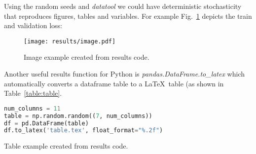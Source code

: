 \documentclass[journal]{IEEEtran}
\begin{document}
Using the random seeds and \textit{datatool} we could have deterministic stochasticity that reproduces figures, tables and variables.
For example Fig.~\ref{fig:image} depicts the train and validation loss:
\begin{figure}[h]
	\texttt{[image: results/image.pdf]}
	\caption{Image example created from results code.}
	\label{fig:image}
\end{figure}

Another useful results function for Python is \textit{pandas.DataFrame.to\_latex} which automatically converts a dataframe table to a \LaTeX\ table (as shown in Table~\ref{table:table}.

\begin{lstlisting}[language=python, style=lststyle, caption={Convert Pandas DataFrame to \LaTeX\ table.}, captionpos=b]
num_columns = 11
table = np.random.random((7, num_columns))
df = pd.DataFrame(table)
df.to_latex('table.tex', float_format="%.2f")
\end{lstlisting}

\begin{table}[h]
	\centering
	\caption{Table example created from results code.}
	\label{table:table}
	\setlength\tabcolsep{4.2pt}
	
\end{table}



\end{document}
